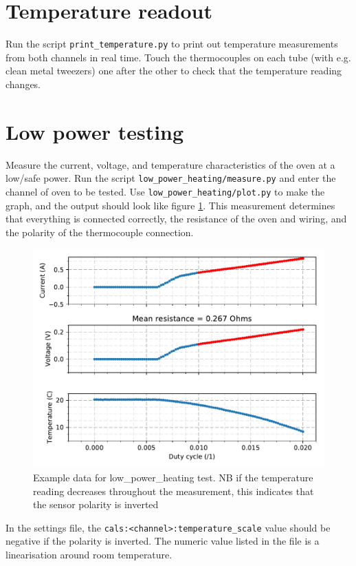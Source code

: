 \documentclass{article}
\begin{document}
\section{Temperature readout}
Run the script \texttt{print\_temperature.py} to print out temperature measurements from both channels in real time. Touch the thermocouples on each tube (with e.g. clean metal tweezers) one after the other to check that the temperature reading changes.

\clearpage
\section{Low power testing}
Measure the current, voltage, and temperature characteristics of the oven at a low/safe power.
Run the script \texttt{low\_power\_heating/measure.py} and enter the channel of oven to be tested.
Use \texttt{low\_power\_heating/plot.py} to make the graph, and the output should look like figure \ref{fig:low_power_heating}.
This measurement determines that everything is connected correctly, the resistance of the oven and wiring, and the polarity of the thermocouple connection.

\begin{figure}
    \center
    \includegraphics[scale=1]{figures/current_vs_duty_0.pdf}
    \caption{Example data for low\_power\_heating test. NB if the temperature reading decreases throughout the measurement, this indicates that the sensor polarity is inverted}
    \label{fig:low_power_heating}
\end{figure}

In the settings file, the \texttt{cals:<channel>:temperature\_scale} value should be negative if the polarity is inverted.
The numeric value listed in the file is a linearisation around room temperature.
\end{document}
